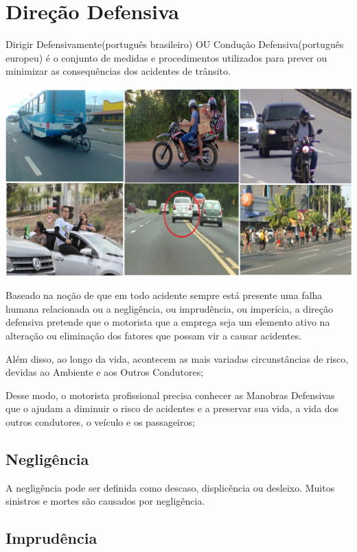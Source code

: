 \documentclass[
  letterpaper,
  DIV=11,
  numbers=noendperiod]{scrreport}
\begin{document}
\hypertarget{direuxe7uxe3o-defensiva}{%
\section{Direção Defensiva}\label{direuxe7uxe3o-defensiva}}

Dirigir Defensivamente(português brasileiro) OU Condução
Defensiva(português europeu) é o conjunto de medidas e procedimentos
utilizados para prever ou minimizar as consequências dos acidentes de
trânsito.

\includegraphics{./images/image-1151365635.png}

Baseado na noção de que em todo acidente sempre está presente uma falha
humana relacionada ou a negligência, ou imprudência, ou imperícia, a
direção defensiva pretende que o motorista que a emprega seja um
elemento ativo na alteração ou eliminação dos fatores que possam vir a
causar acidentes.

Além disso, ao longo da vida, acontecem as mais variadas circunstâncias
de risco, devidas ao Ambiente e aos Outros Condutores;

Desse modo, o motorista profissional precisa conhecer as Manobras
Defensivas que o ajudam a diminuir o risco de acidentes e a preservar
sua vida, a vida dos outros condutores, o veículo e os passageiros;

\hypertarget{negliguxeancia}{%
\subsection{\texorpdfstring{\textbf{Negligência}}{Negligência}}\label{negliguxeancia}}

A negligência pode ser definida como descaso, displicência ou desleixo.
Muitos sinistros e mortes são causados por negligência.

\hypertarget{impruduxeancia}{%
\subsection{\texorpdfstring{\textbf{Imprudência}}{Imprudência}}\label{impruduxeancia}}
\end{document}
